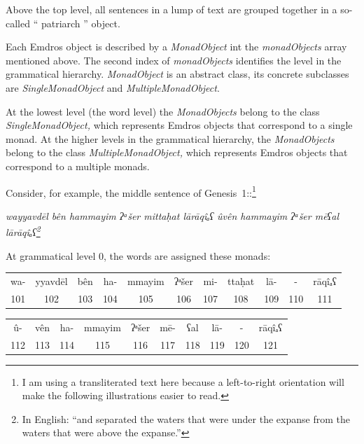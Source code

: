 \documentclass[11pt,oneside,a4paper]{memoir}
\newcommand*{\bibleref}[3]{#1~#2\thinspace:\thinspace#3}
\newcommand*{\indexw}[1]{%
  #1%
  \index{#1}%
}
\begin{document}
Above the top level, all sentences in a lump of text are grouped together in a so-called
``\indexw{patriarch}'' object.

Each Emdros object is described by a \emph{MonadObject} int the \emph{monadObjects} array mentioned
above. The second index of \emph{monadObjects} identifies the level in the grammatical hierarchy.
\emph{MonadObject} is an abstract class, its concrete subclasses are \emph{SingleMonadObject} and
\emph{MultipleMonadObject}.

At the lowest level (the word level) the \emph{MonadObjects} belong to the class
\emph{SingleMonadObject,} which represents Emdros objects that correspond to a single monad. At the
higher levels in the grammatical hierarchy, the \emph{MonadObjects} belong to the class
\emph{MultipleMonadObject,} which represents Emdros objects that correspond to a multiple monads.

Consider, for example, the middle sentence of \bibleref{Genesis}{1}{7}:\footnote{I am using a transliterated text
  here because a left-to-right orientation will make the following illustrations easier to read.}

\begin{center}
\em{wayyavdēl bên hammayim ʔᵃšer mittaḥat lārāqîₐʕ ûvên hammayim ʔᵃšer mēʕal lārāqîₐʕ}\thinspace\footnote{In English: ``and separated the waters that were under the expanse from the waters that were above
the expanse.''}
\end{center}

\Needspace*{5cm}%
At grammatical level 0, the words are assigned these monads:

\begin{center}
\begin{shaded}
\begin{tabu}{@{}c|c|c|c|c|c|c|c|c|c|c@{}}
wa- & yyavdēl & bên & ha- & mmayim & ʔᵃšer & mi- & ttaḥat & lā- & - & rāqîₐʕ \\
101 & 102 & 103 & 104 & 105 & 106 & 107 & 108 & 109 & 110 & 111 \\
\end{tabu}

\vspace{5mm}

\begin{tabu}{@{}c|c|c|c|c|c|c|c|c|c@{}}
û- & vên & ha- & mmayim & ʔᵃšer & mē- & ʕal & lā- & - & rāqîₐʕ\\
112 & 113 & 114 & 115 & 116 & 117 & 118 & 119 & 120 & 121\\
\end{tabu}
\end{shaded}
\end{center}
\end{document}
